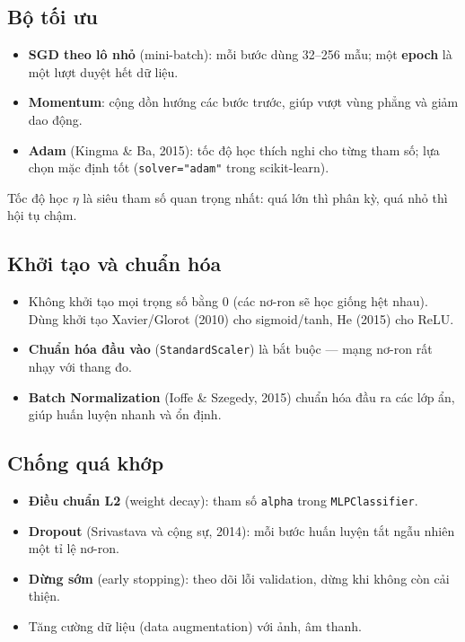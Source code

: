 \subsection{Bộ tối ưu}
\begin{itemize}
    \item \textbf{SGD theo lô nhỏ} (mini-batch): mỗi bước dùng 32--256 mẫu; một \textbf{epoch} là một lượt duyệt hết dữ liệu.
    \item \textbf{Momentum}: cộng dồn hướng các bước trước, giúp vượt vùng phẳng và giảm dao động.
    \item \textbf{Adam} (Kingma \& Ba, 2015): tốc độ học thích nghi cho từng tham số; lựa chọn mặc định tốt (\texttt{solver="adam"} trong scikit-learn).
\end{itemize}
Tốc độ học $\eta$ là siêu tham số quan trọng nhất: quá lớn thì phân kỳ, quá nhỏ thì hội tụ chậm.

\subsection{Khởi tạo và chuẩn hóa}
\begin{itemize}
    \item Không khởi tạo mọi trọng số bằng 0 (các nơ-ron sẽ học giống hệt nhau). Dùng khởi tạo Xavier/Glorot (2010) cho sigmoid/tanh, He (2015) cho ReLU.
    \item \textbf{Chuẩn hóa đầu vào} (\texttt{StandardScaler}) là bắt buộc --- mạng nơ-ron rất nhạy với thang đo.
    \item \textbf{Batch Normalization} (Ioffe \& Szegedy, 2015) chuẩn hóa đầu ra các lớp ẩn, giúp huấn luyện nhanh và ổn định.
\end{itemize}

\subsection{Chống quá khớp}
\begin{itemize}
    \item \textbf{Điều chuẩn L2} (weight decay): tham số \texttt{alpha} trong \texttt{MLPClassifier}.
    \item \textbf{Dropout} (Srivastava và cộng sự, 2014): mỗi bước huấn luyện tắt ngẫu nhiên một tỉ lệ nơ-ron.
    \item \textbf{Dừng sớm} (early stopping): theo dõi lỗi validation, dừng khi không còn cải thiện.
    \item Tăng cường dữ liệu (data augmentation) với ảnh, âm thanh.
\end{itemize}

